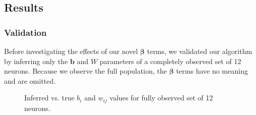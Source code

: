 \documentclass{article}
\begin{document}
\subsection{Results}

\subsubsection{Validation}

Before investigating the effects of our novel $\bm{\beta}$ terms, we validated our algorithm by inferring only the $\mathbf{b}$ and $W$ parameters of a completely observed set of 12 neurons. Because we observe the full population, the $\bm{\beta}$ terms have no meaning and are omitted.

\begin{figure}
\label{fig:validation}
\centering
{}
\caption{Inferred vs. true $b_i$ and $w_{ij}$ values for fully observed set of 12 neurons.}
\end{figure}
\end{document}
